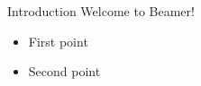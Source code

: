 \documentclass{beamer}
\begin{document}
\begin{frame}{Introduction}
  Welcome to Beamer!
  \begin{itemize}
    \item First point
    \item Second point
  \end{itemize}
\end{frame}
\end{document}
